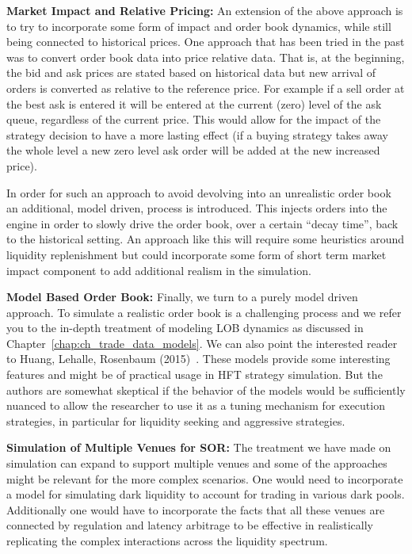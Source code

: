 \noindent\textbf{Market Impact and Relative Pricing:} An extension of the above approach is to try to incorporate some form of impact and order book dynamics, while still being connected to historical prices. One approach that has been tried in the past was to convert order book data into price relative data. That is, at the beginning, the bid and ask prices are stated based on historical data but new arrival of orders is converted as relative to the reference price. For example if a sell order at the best ask is entered it will be entered at the current (zero) level of the ask queue, regardless of the current price. This would allow for the impact of the strategy decision to have a more lasting effect (if a buying strategy takes away the whole level a new zero level ask order will be added at the new increased price). 


In order for such an approach to avoid devolving into an unrealistic order book an additional, model driven, process is introduced. This injects orders into the engine in order to slowly drive the order book, over a certain ``decay time'', back to the historical setting. An approach like this will require some heuristics around liquidity replenishment but could incorporate some form of short term market impact component to add additional realism in the simulation. \twomedskip


\noindent\textbf{Model Based Order Book:} Finally, we turn to a purely model driven approach. To simulate a realistic order book is a challenging process and we refer you to the in-depth treatment of modeling LOB dynamics as discussed in Chapter~\ref{chap:ch_trade_data_models}. We can also point the interested reader to Huang, Lehalle, Rosenbaum (2015)~\cite{hlehros}. These models provide some interesting features and might be of practical usage in HFT strategy simulation. But the authors are somewhat skeptical if the behavior of the models would be sufficiently nuanced to allow the researcher to use it as a tuning mechanism for execution strategies, in particular for liquidity seeking and aggressive strategies.
\twomedskip


\noindent\textbf{Simulation of Multiple Venues for SOR:} The treatment we have made on simulation can expand to support multiple venues and some of the approaches might be relevant for the more complex scenarios. One would need to incorporate a model for simulating dark liquidity to account for trading in various dark pools. Additionally one would have to incorporate the facts that all these venues are connected by regulation and latency arbitrage to be effective in realistically replicating the complex interactions across the liquidity spectrum.\twomedskip



